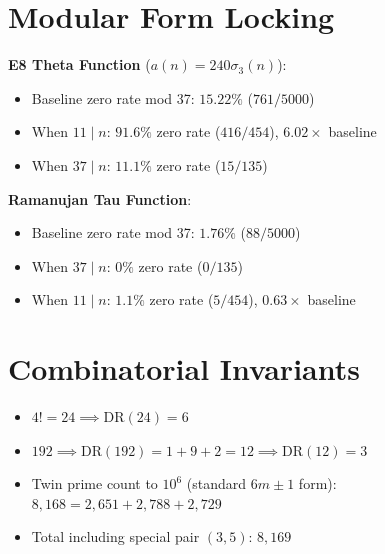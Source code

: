 \documentclass[11pt,a4paper]{article}
\begin{document}
\section{Modular Form Locking}

\textbf{E8 Theta Function} ($a(n) = 240\sigma_3(n)$):
\begin{itemize}
    \item Baseline zero rate mod 37: $15.22\%$ ($761/5000$)
    \item When $11 \mid n$: $91.6\%$ zero rate ($416/454$), $6.02\times$ baseline
    \item When $37 \mid n$: $11.1\%$ zero rate ($15/135$)
\end{itemize}

\textbf{Ramanujan Tau Function}:
\begin{itemize}
    \item Baseline zero rate mod 37: $1.76\%$ ($88/5000$)
    \item When $37 \mid n$: $0\%$ zero rate ($0/135$)
    \item When $11 \mid n$: $1.1\%$ zero rate ($5/454$), $0.63\times$ baseline
\end{itemize}

\section{Combinatorial Invariants}

\begin{itemize}
    \item $4! = 24 \implies \text{DR}(24) = 6$
    \item $192 \implies \text{DR}(192) = 1 + 9 + 2 = 12 \implies \text{DR}(12) = 3$
    \item Twin prime count to $10^6$ (standard $6m\pm1$ form): $8{,}168 = 2{,}651 + 2{,}788 + 2{,}729$
    \item Total including special pair $(3,5)$: $8{,}169$
\end{itemize}
\end{document}

